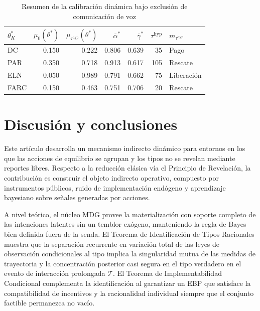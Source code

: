 \documentclass[pdflatex,sn-mathphys-ay]{sn-jnl}
\theoremstyle{thmstyleone}
\theoremstyle{thmstyletwo}
\theoremstyle{thmstylethree}
\newcommand{\1}{\mathbf{1}}
\begin{document}
\begin{table}[!ht]
\caption{Resumen de la calibración dinámica bajo exclusión de comunicación de voz}
\label{tab:calibracion-resumen-novoice}
\small
\begin{tabular}{lrrrrrl}
\toprule
$\theta_K^\ast$ & $\mu_0(\theta^\ast)$ & $\mu_{\tau^{\mathrm{hyp}}}(\theta^\ast)$ & $\bar{\alpha}^\ast$ & $\bar{\gamma}^\ast$ & $\tau^{\mathrm{hyp}}$ & $m_{\tau^{\mathrm{hyp}}}$ \\
\midrule
DC & 0.150 & 0.222 & 0.806 & 0.639 & 35 & Pago \\
PAR & 0.350 & 0.718 & 0.913 & 0.617 & 105 & Rescate \\
ELN & 0.050 & 0.989 & 0.791 & 0.662 & 75 & Liberación \\
FARC & 0.150 & 0.463 & 0.751 & 0.706 & 20 & Rescate \\
\bottomrule
\end{tabular}
\end{table}

\section{Discusión y conclusiones}\label{sec:conclusiones}

Este artículo desarrolla un mecanismo indirecto dinámico para entornos en los que las acciones de equilibrio se agrupan y los tipos no se revelan mediante reportes libres. Respecto a la reducción clásica vía el Principio de Revelación, la contribución es construir el objeto indirecto operativo, compuesto por instrumentos públicos, ruido de implementación endógeno y aprendizaje bayesiano sobre señales generadas por acciones.

A nivel teórico, el núcleo MDG provee la materialización con soporte completo de las intenciones latentes sin un temblor exógeno, manteniendo la regla de Bayes bien definida fuera de la senda. El Teorema de Identificación de Tipos Racionales muestra que la separación recurrente en variación total de las leyes de observación condicionales al tipo implica la singularidad mutua de las medidas de trayectoria y la concentración posterior casi segura en el tipo verdadero en el evento de interacción prolongada $\mathcal{T}$. El Teorema de Implementabilidad Condicional complementa la identificación al garantizar un EBP que satisface la compatibilidad de incentivos y la racionalidad individual siempre que el conjunto factible permanezca no vacío.
\end{document}
